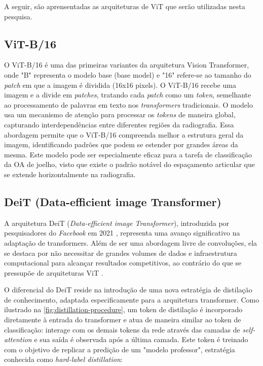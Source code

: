 A seguir, são aprensentadas as arquiteturas de ViT que serão utilizadas nesta pesquisa.

\subsection{ViT-B/16}

O ViT-B/16 \cite{Dosovitskiy2021} é uma das primeiras variantes da arquitetura Vision Transformer, onde "B" representa o modelo base (base model) e "16" refere-se ao tamanho do \textit{patch} em que a imagem é dividida (16x16 pixels). O ViT-B/16 recebe uma imagem e a divide em \textit{patches}, tratando cada \textit{patch} como um \textit{token}, semelhante ao processamento de palavras em texto nos \textit{transformers} tradicionais. O modelo usa um mecanismo de atenção para processar os \textit{tokens} de maneira global, capturando interdependências entre diferentes regiões da radiografia. Essa abordagem permite que o ViT-B/16 compreenda melhor a estrutura geral da imagem, identificando padrões que podem se estender por grandes áreas da mesma. Este modelo pode ser especialmente eficaz para a tarefa de classificação da OA de joelho, visto que existe o padrão notável do espaçamento articular que se extende horizontalmente na radiografia.

\subsection{DeiT (Data-efficient image Transformer)}

A arquitetura DeiT (\textit{Data-efficient image Transformer}), introduzida por pesquisadores do \textit{Facebook} em 2021 \citep{Touvron2021}, representa uma avanço significativo na adaptação de transformers. Além de ser uma abordagem livre de convoluções, ela se destaca por não necessitar de grandes volumes de dados e infraestrutura computacional para alcançar resultados competitivos, ao contrário do que se pressupõe de arquiteturas ViT \cite{Dosovitskiy2021}.

O diferencial do DeiT reside na introdução de uma nova estratégia de distilação de conhecimento, adaptada especificamente para a arquitetura transformer. Como ilustrado na \autoref{fig:distillation-procedure}, um token de distilação é incorporado diretamente à entrada do transformer e atua de maneira similar ao token de classificação: interage com os demais tokens da rede através das camadas de \textit{self-attention} e sua saída é observada após a última camada. Este token é treinado com o objetivo de replicar a predição de um "modelo professor", estratégia conhecida como \textit{hard-label distillation}:

